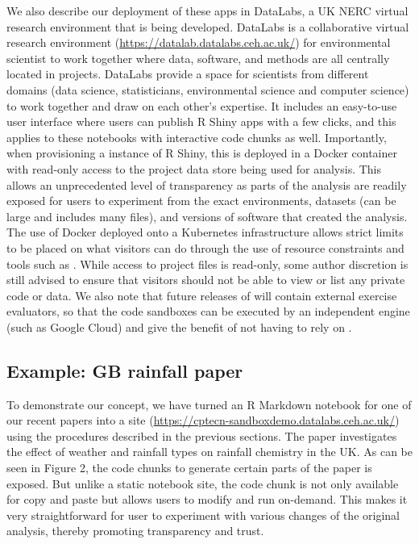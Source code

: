 We also describe our deployment of these apps in DataLabs, a UK NERC
virtual research environment that is being developed. DataLabs is a
collaborative virtual research environment \citep{Hollaway2020}
(\url{https://datalab.datalabs.ceh.ac.uk/}) for environmental scientist
to work together where data, software, and methods are all centrally
located in projects. DataLabs provide a space for scientists from
different domains (data science, statisticians, environmental science
and computer science) to work together and draw on each other's
expertise. It includes an easy-to-use user interface where users can
publish R Shiny apps with a few clicks, and this applies to these
notebooks with interactive code chunks as well. Importantly, when
provisioning a instance of R Shiny, this is deployed in a Docker
container with read-only access to the project data store being used for
analysis. This allows an unprecedented level of transparency as parts of
the analysis are readily exposed for users to experiment from the exact
environments, datasets (can be large and includes many files), and
versions of software that created the analysis. The use of Docker
deployed onto a Kubernetes infrastructure allows strict limits to be
placed on what visitors can do through the use of resource constraints
and tools such as  \citep{RAppArmor}. While access to
project files is read-only, some author discretion is still advised to
ensure that visitors should not be able to view or list any private code
or data. We also note that future releases of  will
contain external exercise evaluators, so that the code sandboxes can be
executed by an independent engine (such as Google Cloud) and give the
benefit of not having to rely on .

\hypertarget{example-gb-rainfall-paper}{%
\subsection{Example: GB rainfall
paper}\label{example-gb-rainfall-paper}}

To demonstrate our concept, we have turned an R Markdown notebook for one of our recent papers \citep{Tso2022} into a  site
(\url{https://cptecn-sandboxdemo.datalabs.ceh.ac.uk/}) using the
procedures described in the previous sections. The paper investigates
the effect of weather and rainfall types on rainfall chemistry in the
UK. As can be seen in Figure 2, the code chunks to generate certain
parts of the paper is exposed. But unlike a static notebook site, the
code chunk is not only available for copy and paste but allows users to
modify and run on-demand. This makes it very straightforward for user to
experiment with various changes of the original analysis, thereby
promoting transparency and trust.

